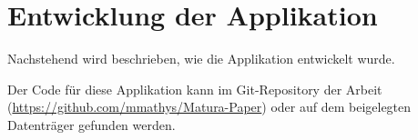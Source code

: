 \chapter{Entwicklung der Applikation}

Nachstehend wird beschrieben, wie die Applikation entwickelt wurde.

Der Code für diese Applikation kann im Git-Repository der Arbeit (\url{https://github.com/mmathys/Matura-Paper}) oder auf dem beigelegten Datenträger gefunden werden.








% 